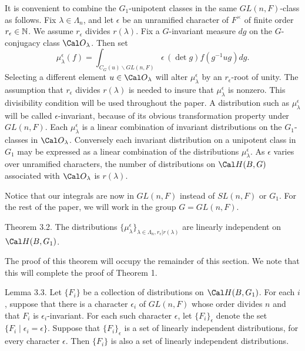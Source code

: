 It is convenient to combine the $G_1$-unipotent classes in 
  the same $GL(n,F)$-class as follows.
Fix
  $ \lambda \in \Lambda_n $,
and let
  $ \epsilon $
be an unramified character of $F^\times$ 
of finite order
  $ r_{\epsilon} \in {\Bbb N}$.
We assume
  $ r_{\epsilon} $
divides
  $ r(\lambda) $.
Fix a $G$-invariant measure $dg$
on the $G$-conjugacy class
  $ {\Cal O}_{\lambda} $.
Then set
%
$$
  \mu_{\lambda}^{\epsilon} (f) =
  \int_{ C_G (u) \backslash GL(n,F) }
  \epsilon \, (\det g) f
  (g^{-1} ug)dg.
$$
%
Selecting a different element
 $ u \in {\Cal O}_{\lambda} $
will alter
  $ \mu_{\lambda}^{\epsilon} $
by an
  $ r_{\epsilon}$-root of unity.
The assumption that
  $ r_{\epsilon} $
divides
  $ r(\lambda) $
is needed to insure that
  $ \mu_{\lambda}^{\epsilon} $
is nonzero. 
This divisibility condition will be used throughout the paper.  A
distribution such as $\mu^\epsilon_\lambda$ will be called
$\epsilon$-invariant, because of its obvious transformation
property under $GL(n,F)$.
Each
  $ \mu_{\lambda}^{\epsilon} $
is a linear combination of invariant distributions
  on the $G_1$-classes in
  $ {\Cal O}_{\lambda} $.
Conversely each invariant distribution on a unipotent class in $G_1$ 
may be expressed as a linear combination of the distributions
  $ \mu_{\lambda}^{\epsilon} $.
As 
   $ \epsilon $
varies over unramified characters, the number of
  distributions on
  $ {\Cal H}(B, G)  $ associated with ${\Cal O}_\lambda$ is $r(\lambda)$.

Notice that our integrals are now in 
  $ GL (n,F) $
instead of
  $ SL(n,F)  $ or $G_1$.
For the rest of the paper, we will work in the group
  $ G = GL (n,F) $.

\proclaim Theorem {3.2}.
The distributions
  $ \bigl\{
      \mu_{\lambda}^{\epsilon} 
    \bigr\}_{\lambda \in 
             \Lambda_n ,
             r_{\epsilon}
            |r(\lambda) } $
are linearly independent on \linebreak
  $ {\Cal H}(B, G_1) $.
\finishproclaim

The proof of this theorem will occupy the remainder of this section.
We note that this will complete the proof of Theorem 1.

\proclaim Lemma {3.3}.
Let $\{F_i\}$ be a collection of distributions on ${\Cal H}(B,G_1)$.
For each $i$,
suppose that there is a character $\epsilon_i$ of
$GL(n,F)$ whose order divides $n$ and that $F_i$ is $\epsilon_i$-invariant.  For each
such character $\epsilon$, let $\{F_i\}_\epsilon$ denote the
set $\{F_i\mid \epsilon_i=\epsilon\}$.  Suppose that
$\{F_i\}_\epsilon$ is a set of linearly independent distributions,
for every character $\epsilon$.  Then $\{F_i\}$ is also a set
of linearly
independent distributions.
\finishproclaim

